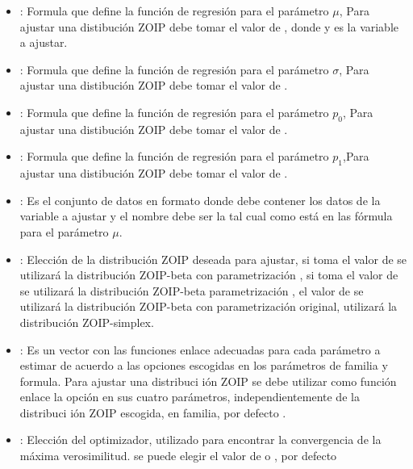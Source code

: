\begin{itemize}[noitemsep, nolistsep]

\item {}: Formula que define la funci\'{o}n de regresi\'{o}n para el par\'{a}metro $\mu$, Para ajustar una distibuci\'{o}n ZOIP debe tomar el valor de , donde y es la variable a ajustar.
\item {}: Formula que define la funci\'{o}n de regresi\'{o}n para el par\'{a}metro $\sigma$, Para ajustar una distibuci\'{o}n ZOIP debe tomar el valor de .
\item {}: Formula que define la funci\'{o}n de regresi\'{o}n para el par\'{a}metro $p_0$, Para ajustar una distibuci\'{o}n ZOIP debe tomar el valor de .
\item {}: Formula que define la funci\'{o}n de regresi\'{o}n para el par\'{a}metro $p_1$,Para ajustar una distibuci\'{o}n ZOIP debe tomar el valor de .
\item {}: Es el conjunto de datos en formato  donde debe contener los datos de la variable a ajustar y el nombre debe ser la tal cual como est\'{a} en las f\'{o}rmula para el par\'{a}metro $\mu$.
\item {}: Elecci\'{o}n de la distribuci\'{o}n ZOIP deseada para ajustar, si toma el valor de  se utilizar\'{a} la distribuci\'{o}n ZOIP-beta con parametrizaci\'{o}n  \cite{Stasinopoulos2}, si toma el valor de  se utilizar\'{a} la distribuci\'{o}n ZOIP-beta parametrizaci\'{o}n \cite{Ferrari2}, el valor de  se utilizar\'{a} la distribuci\'{o}n ZOIP-beta con parametrizaci\'{o}n original,  utilizar\'{a} la distribuci\'{o}n ZOIP-simplex.
\item {}: Es un vector con las funciones enlace adecuadas para cada par\'{a}metro a estimar de acuerdo a las opciones escogidas en los par\'{a}metros de familia y formula. Para ajustar una distribuci i\'{o}n ZOIP se debe utilizar como funci\'{o}n enlace la opci\'{o}n  en sus cuatro par\'{a}metros, independientemente de la distribuci i\'{o}n ZOIP escogida, en familia, por defecto .
\item {}: Elecci\'{o}n del optimizador, utilizado para encontrar la convergencia de la m\'{a}xima verosimilitud. se puede elegir el valor de  o , por defecto 
\end{itemize}

